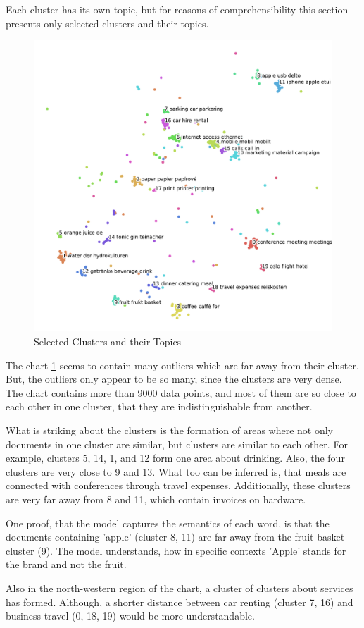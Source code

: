 Each cluster has its own topic, but for reasons of comprehensibility this section presents only selected clusters and their topics.

\begin{figure}[!h]
	\centering
	\includegraphics[width=\textwidth]{Bilder/models/topics.pdf}
	\caption{Selected Clusters and their Topics}
	\label{fig:topics}
\end{figure}

The chart \ref{fig:topics} seems to contain many outliers which are far away from their cluster. But, the outliers only appear to be so many, since the clusters are very dense. The chart contains more than 9000 data points, and most of them are so close to each other in one cluster, that they are indistinguishable from another.

What is striking about the clusters is the formation of areas where not only documents in one cluster are similar, but clusters are similar to each other. For example, clusters 5, 14, 1, and 12 form one area about drinking. Also, the four clusters are very close to 9 and 13. What too can be inferred is, that meals are connected with conferences through travel expenses. Additionally, these clusters are very far away from 8 and 11, which contain invoices on hardware. 

One proof, that the model captures the semantics of each word, is that the documents containing 'apple' (cluster 8, 11) are far away from the fruit basket cluster (9). The model understands, how in specific contexts 'Apple' stands for the brand and not the fruit.

Also in the north-western region of the chart, a cluster of clusters about services has formed. Although, a shorter distance between car renting (cluster 7, 16) and business travel (0, 18, 19) would be more understandable.
